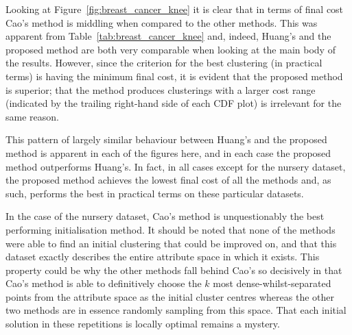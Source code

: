 \documentclass[11pt]{article}
\begin{document}
Looking at Figure~\ref{fig:breast_cancer_knee} it is clear that in terms of
final cost Cao's method is middling when compared to the other methods. This
was apparent from Table~\ref{tab:breast_cancer_knee} and, indeed, Huang's and
the proposed method are both very comparable when looking at the main body of
the results. However, since the criterion for the best clustering (in practical
terms) is having the minimum final cost, it is evident that the proposed method
is superior; that the method produces clusterings with a larger cost
range (indicated by the trailing right-hand side of each CDF plot) is irrelevant
for the same reason.

This pattern of largely similar behaviour between Huang's and the proposed
method is apparent in each of the figures here, and in each case the proposed
method outperforms Huang's. In fact, in all cases except for the nursery
dataset, the proposed method achieves the lowest final cost of all the methods
and, as such, performs the best in practical terms on these particular datasets.

In the case of the nursery dataset, Cao's method is unquestionably the best
performing initialisation method. It should be noted that none of the
methods were able to find an initial clustering that could be improved on, and
that this dataset exactly describes the entire attribute space in which it
exists. This property could be why the other methods fall behind Cao's so
decisively in that Cao's method is able to definitively choose the \(k\) most
dense-whilst-separated points from the attribute space as the initial cluster
centres whereas the other two methods are in essence randomly sampling from this
space. That each initial solution in these repetitions is locally optimal
remains a mystery.
\end{document}
